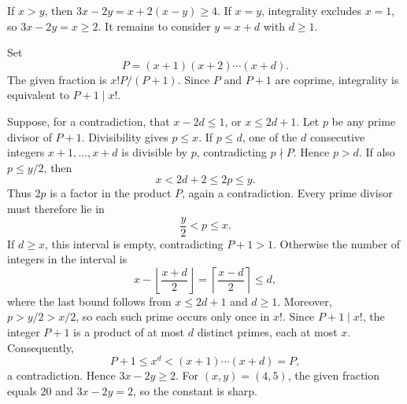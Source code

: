 If $x>y$, then $3x-2y=x+2(x-y)\ge4$. If $x=y$, integrality excludes $x=1$, so $3x-2y=x\ge2$. It remains to consider $y=x+d$ with $d\ge1$.

Set
\[
 P=(x+1)(x+2)\cdots(x+d).
\]
The given fraction is $x!P/(P+1)$. Since $P$ and $P+1$ are coprime, integrality is equivalent to $P+1\mid x!$.

Suppose, for a contradiction, that $x-2d\le1$, or $x\le2d+1$. Let $p$ be any prime divisor of $P+1$. Divisibility gives $p\le x$. If $p\le d$, one of the $d$ consecutive integers $x+1,\ldots,x+d$ is divisible by $p$, contradicting $p\nmid P$. Hence $p>d$. If also $p\le y/2$, then
\[
 x<2d+2\le2p\le y.
\]
Thus $2p$ is a factor in the product $P$, again a contradiction. Every prime divisor must therefore lie in
\[
 \frac y2<p\le x.
\]
If $d\ge x$, this interval is empty, contradicting $P+1>1$. Otherwise the number of integers in the interval is
\[
 x-\left\lfloor\frac{x+d}{2}\right\rfloor
 =\left\lceil\frac{x-d}{2}\right\rceil\le d,
\]
where the last bound follows from $x\le2d+1$ and $d\ge1$. Moreover, $p>y/2>x/2$, so each such prime occurs only once in $x!$. Since $P+1\mid x!$, the integer $P+1$ is a product of at most $d$ distinct primes, each at most $x$. Consequently,
\[
 P+1\le x^d<(x+1)\cdots(x+d)=P,
\]
a contradiction. Hence $3x-2y\ge2$. For $(x,y)=(4,5)$, the given fraction equals $20$ and $3x-2y=2$, so the constant is sharp.

